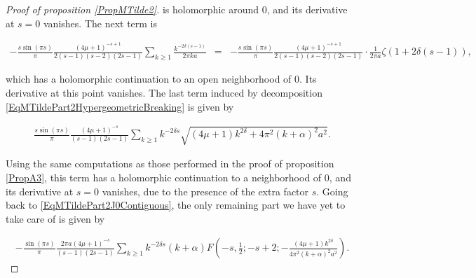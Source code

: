 \documentclass{jams-l}
\theoremstyle{definition}
\theoremstyle{remark}
\numberwithin{equation}{section}
\begin{document}
\begin{proof}[Proof of proposition \ref{PropMTilde2}]
                        \noindent is holomorphic around $0$, and its derivative at $s=0$ vanishes. The next term is
                        
                        \[ \begin{array}{lll}
                                \scriptstyle - \frac{s \sin \left( \pi s \right)}{\pi} \frac{\left( 4 \mu + 1 \right)^{-s+1}}{2 \left( s-1 \right) \left( s - 2 \right) \left( 2s-1 \right)} \sum\limits_{k \geqslant 1} \frac{k^{-2 \delta \left( s - 1 \right)}}{2 \pi k a} & \scriptstyle = & \scriptstyle - \frac{s \sin \left( \pi s \right)}{\pi} \frac{\left( 4 \mu + 1 \right)^{-s+1}}{2 \left( s-1 \right) \left( s - 2 \right) \left( 2s-1 \right)} \cdot \frac{1}{2 \pi a} \zeta \left( 1 + 2 \delta \left( s - 1 \right) \right),
                            \end{array} \]
                        
                        \noindent which has a holomorphic continuation to an open neighborhood of $0$. Its derivative at this point vanishes. The last term induced by decomposition \eqref{EqMTildePart2HypergeometricBreaking} is given by
                        
                        \[ \begin{array}{c}
                                \frac{s \sin \left( \pi s \right)}{\pi} \frac{\left( 4 \mu + 1 \right)^{-s}}{\left( s-1 \right) \left( 2s-1 \right)} \sum\limits_{k \geqslant 1} k^{-2 \delta s} \sqrt{\left( 4 \mu + 1 \right) k^{2 \delta} + 4 \pi^2 \left( k + \alpha \right)^2 a^2}.
                            \end{array} \]
                        
                        \noindent Using the same computations as those performed in the proof of proposition \ref{PropA3}, this term has a holomorphic continuation to a neighborhood of $0$, and its derivative at $s=0$ vanishes, due to the presence of the extra factor $s$. Going back to \eqref{EqMTildePart2J0Contiguous}, the only remaining part we have yet to take care of is given by
                        
                        \[ \begin{array}{c}
                                - \frac{\sin \left( \pi s \right)}{\pi} \frac{2 \pi a \left( 4 \mu + 1 \right)^{-s}}{\left( s-1 \right) \left( 2s-1 \right)} \sum\limits_{k \geqslant 1} k^{- 2 \delta s} \left( k + \alpha \right) F \left( -s, \frac{1}{2}; -s+2; - \frac{\left( 4 \mu + 1 \right) k^{2 \delta}}{4 \pi^2 \left( k + \alpha \right)^2 a^2} \right).
                            \end{array} \]
                        

\end{proof}
\end{document}

